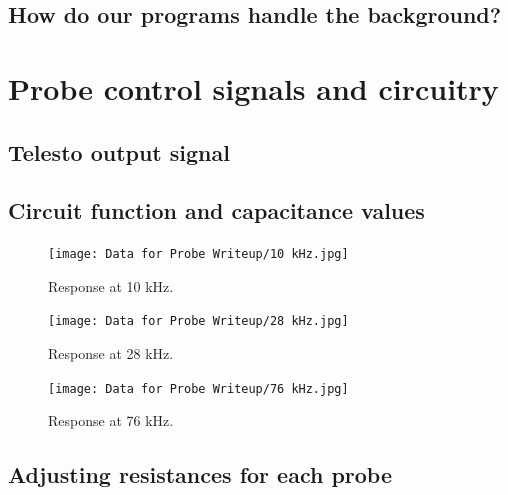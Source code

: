 \documentclass{article}
\begin{document}
\par{}

\subsection{How do our programs handle the background?}

\par{}

\section{Probe control signals and circuitry}\label{circsection}
\hypertarget{circsection}{}

\par{}

\subsection{Telesto output signal}

\par{}

\subsection{Circuit function and capacitance values}

\par{}

\begin{figure}[!h]
	\centering
	\texttt{[image: Data for Probe Writeup/10 kHz.jpg]}
	\caption{Response at 10 kHz.}
\end{figure}

\begin{figure}[!h]
	\centering
	\texttt{[image: Data for Probe Writeup/28 kHz.jpg]}
	\caption{Response at 28 kHz.}
\end{figure}

\begin{figure}[!h]
	\centering
	\texttt{[image: Data for Probe Writeup/76 kHz.jpg]}
	\caption{Response at 76 kHz.}
\end{figure}

\subsection{Adjusting resistances for each probe}

\par{}
\end{document}
